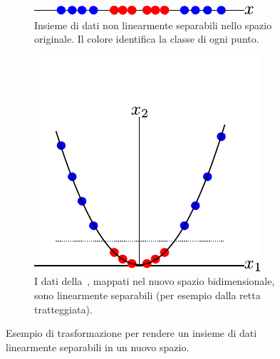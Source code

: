\begin{figure}
    \begin{subfigure}[t]{.45\textwidth}
        \centering
        \includegraphics[width=\textwidth]{img/non_linearmente_separabili.pdf}
        \caption{Insieme di dati non linearmente separabili nello spazio originale. Il colore identifica la classe di ogni punto.}
        \label{fig:kerneltrick:non_lin_sep}
    \end{subfigure}%
    \hfill
    \begin{subfigure}[t]{.45\textwidth}
        \centering
        \includegraphics[width=\textwidth]{img/kernel_trick_visualized.pdf}
        \caption{I dati della~, mappati nel nuovo spazio bidimensionale, sono linearmente separabili (per esempio dalla retta tratteggiata).}
        \label{fig:kerneltrick:visualized}
    \end{subfigure}%
    \caption[Esempio trasformazione di dati in un nuovo spazio.]{Esempio di trasformazione per rendere un insieme di dati linearmente separabili in un nuovo spazio.}
\end{figure}


